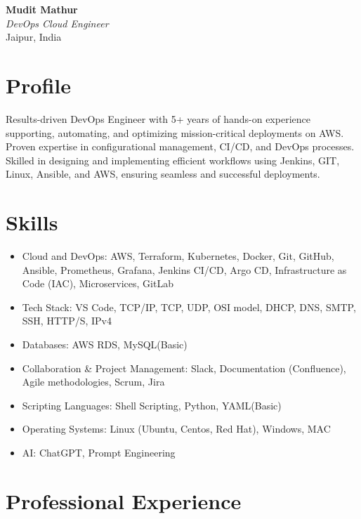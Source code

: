\documentclass[a4paper,10pt]{article}
\begin{document}
\pagestyle{empty}

\begin{center}
    \textbf{\LARGE Mudit Mathur}\\
    \textit{DevOps Cloud Engineer}\\
    Jaipur, India
\end{center}

\section*{Profile}
Results-driven DevOps Engineer with 5+ years of hands-on experience supporting, automating, and optimizing mission-critical deployments on AWS. Proven expertise in configurational management, CI/CD, and DevOps processes. Skilled in designing and implementing efficient workflows using Jenkins, GIT, Linux, Ansible, and AWS, ensuring seamless and successful deployments.

\section*{Skills}
\begin{itemize}[left=0em]
    \item Cloud and DevOps: AWS, Terraform, Kubernetes, Docker, Git, GitHub, Ansible, Prometheus, Grafana, Jenkins CI/CD, Argo CD, Infrastructure as Code (IAC), Microservices, GitLab
    \item Tech Stack: VS Code, TCP/IP, TCP, UDP, OSI model, DHCP, DNS, SMTP, SSH, HTTP/S, IPv4
    \item Databases: AWS RDS, MySQL(Basic)
    \item Collaboration \& Project Management: Slack, Documentation (Confluence), Agile methodologies, Scrum, Jira
    \item Scripting Languages: Shell Scripting, Python, YAML(Basic)
    \item Operating Systems: Linux (Ubuntu, Centos, Red Hat), Windows, MAC
    \item AI: ChatGPT, Prompt Engineering
\end{itemize}

\section*{Professional Experience}
\end{document}
